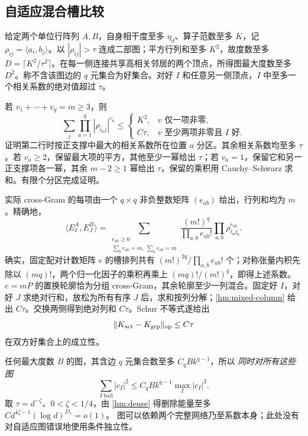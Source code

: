 \documentclass[a4paper]{tufte-handout}
\begin{document}
\begin{fullwidth}
\subsection{自适应混合槽比较}
给定两个单位行阵列 $A,B$，自身相干度至多 $\eta_d$、算子范数至多 $K$，记 $\rho_{ij}=\langle a_i,b_j\rangle$。以 $|\rho_{ij}|>\tau$ 连成二部图；平方行列和至多 $K^2$，故度数至多 $D=\lceil K^2/\tau^2\rceil$。在每一侧连接共享高相关邻居的两个顶点，所得图最大度数至多 $D^2$。称不含该图边的 $q$ 元集合为好集合。对好 $I$ 和任意另一侧顶点，$I$ 中至多一个相关系数的绝对值超过 $\tau$。

若 $v_1+\cdots+v_q=m\ge3$，则
\begin{equation}\label{hm:mixed-column}
 \sum_j\prod_{a=1}^q|\rho_{i_a j}|^{v_a}\le
 \begin{cases}K^2,&v\text{ 仅一项非零},\\C\tau,&v\text{ 至少两项非零且 }I\text{ 好}.
 \end{cases}
\end{equation}
证明第二行时按正支撑中最大的相关系数所在位置 $a$ 分区。其余相关系数均至多 $\tau$。若 $v_a\ge2$，保留最大项的平方，其他至少一幂给出 $\tau$；若 $v_a=1$，保留它和另一正支撑项各一幂，其余 $m-2\ge1$ 幂给出 $\tau$，保留的乘积用 Cauchy--Schwarz 求和。有限个分区完成证明。

实际 cross-Gram 的每项由一个 $q\times q$ 非负整数矩阵 $(e_{ab})$ 给出，行列和均为 $m$。精确地，
\[
 \langle E_I^A,E_J^B\rangle
 =\sum_{\substack{e_{ab}\ge0\\\sum_b e_{ab}=m,\ \sum_a e_{ab}=m}}
 \frac{(m!)^q}{\prod_{a,b}e_{ab}!}
 \prod_{a,b}\rho_{i_a j_b}^{e_{ab}}.
\]
确实，固定配对计数矩阵 $e$ 的槽排列共有 $(m!)^{2q}/\prod_{a,b}e_{ab}!$ 个；对称张量内积先除以 $(mq)!$，两个归一化因子的乘积再乘上 $(mq)!/(m!)^q$，即得上述系数。$e=mP$ 的置换轮廓恰为分组 cross-Gram，其余轮廓至少一列混合。固定好 $I$，对好 $J$ 求绝对行和，放松为所有有序 $J$ 后，求和按列分解；\eqref{hm:mixed-column} 给出 $C\tau$。交换两侧得到绝对列和 $C\tau$。Schur 不等式遂给出
\begin{equation}\label{hm:cross-schur}
 \|K_{\rm act}-K_{\rm grp}\|_{\rm op}\le C\tau
\end{equation}
在双方好集合上的成立性。

任何最大度数 $B$ 的图，其含边 $q$ 元集合数至多 $C_qBk^{q-1}$，所以 \emph{同时对所有这些图}
\[
 \sum_{I\ {\mathrm{bad}}}|c_I|^2\le C_qBk^{q-1}\max_I|c_I|^2.
\]
取 $\tau=d^{-\zeta}$、$0<\zeta<1/4$，由 \eqref{hm:dense} 得删除能量至多
$C d^{4\zeta-1}(\log d)^{D_s}=o(1)$。
图可以依赖两个完整网络乃至系数本身；此处没有对自适应图错误地使用条件独立性。


\end{fullwidth}
\end{document}
